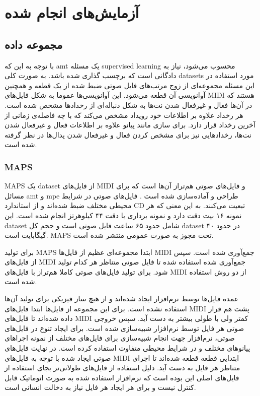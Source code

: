 \chapter{آزمایش‌های انجام شده}
\section{مجموعه داده}
با توجه به این که \gls{amt} یک مسئله \gls{supervised learning} محسوب می‌شود،
نیاز به دادگانی است که برچسب گذاری شده باشد. به صورت کلی \glspl{dataset} مورد
استفاده در این مسئله مجموعه‌ای از زوج مرتب‌های فایل صوتی ضبط شده از یک قطعه و
همچنین آوانویسی آن قطعه می‌شود. این آوانویسی‌ها عموما به شکل فایل‌های \gls{MIDI}
هستند که در آن‌ها فعال و غیرفعال شدن نت‌ها به شکل دنباله‌ای از رخدادها مشخص شده
است. هر رخداد علاوه بر اطلاعات خود رویداد مشخص می‌کند که با چه فاصله‌ی زمانی از
آخرین رخداد قرار دارد. برای سازی مانند پیانو علاوه بر اطلاعات فعال و غیرفعال شدن
نت‌ها، رخدادهایی نیز برای مشخص کردن فعال و غیرفعال شدن پدال‌ها در نظر گرفته شده
است.

\subsection{MAPS}
MAPS یک \gls{dataset} از فایل‌های \gls{MIDI} و فایل‌های صوتی هم‌تراز آن‌ها است
که برای مسائل \gls{amt} و \gls{mpe} طراحی و آماده‌سازی شده است
\cite{emiya2009multipitch}. فایل‌های صوتی در شرایط محیطی مختلف ضبط شده‌اند و از
استاندارد CD تبعیت می‌کنند. به این معنی که هر نمونه ۱۶ بیت دقت دارد و نمونه
برداری با دقت ۴۴ کیلوهرتز انجام شده است. این \gls{dataset} شامل حدود ۶۵ ساعت
فایل صوتی است و حجم کل \gls{dataset} در حدود ۴۰ گیگابایت است. MAPS تحت مجوز
 به صورت عمومی منتشر شده است.

برای تولید MAPS ابتدا مجموعه‌ای عظیم از فایل‌ها \gls{MIDI} جمع‌آوری شده است. سپس
از فایل‌های \gls{MIDI} جمع‌آوری شده استفاده شده تا فایل صوتی متناظر هر کدام
تولید شود. برای تولید فایل‌های صوتی کاملا هم‌تراز با فایل‌های \gls{MIDI} از دو
روش استفاده شده است.

عمده فایل‌ها توسط نرم‌افزار ایجاد شده‌اند و از هیچ ساز فیزیکی برای تولید آن‌ها
استفاده نشده است. برای این مجموعه از فایل‌ها ابتدا فایل‌های \gls{MIDI} پشت هم
قرار داده شده‌اند تا فایل‌های \gls{MIDI} کمتر ولی با طولی بیشتر به دست آید. سپس
خروجی صوتی هر فایل توسط نرم‌افزار  شبیه‌سازی شده است.
برای ایجاد تنوع در فایل‌های صوتی، نرم‌افزار جهت انجام شبیه‌سازی برای فایل‌های
مختلف از نمونه اجراهای پیانوهای مختلف و در شرایط محیطی متفاوت استفاده کرده است.
در نهایت فایل‌های صوتی ایجاد شده با توجه به فایل‌های \gls{MIDI} ابتدایی قطعه
قطعه شده‌اند تا اجرای متناظر هر فایل به دست آید. دلیل استفاده از فایل‌های
طولانی‌تر بجای استفاده از فایل‌های اصلی این بوده است که نرم‌افزار استفاده شده به
صورت اتوماتیک قابل کنترل نیست و برای هر ایجاد هر فایل نیاز به دخالت انسانی است.

